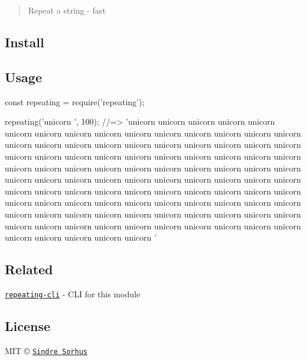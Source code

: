 \begin{quote}
Repeat a string -\/ fast \end{quote}


\subsection*{Install}




\subsection*{Usage}


\begin{DoxyCode}
const repeating = require('repeating');

repeating('unicorn ', 100);
//=> 'unicorn unicorn unicorn unicorn unicorn unicorn unicorn unicorn unicorn unicorn unicorn unicorn
       unicorn unicorn unicorn unicorn unicorn unicorn unicorn unicorn unicorn unicorn unicorn unicorn unicorn unicorn
       unicorn unicorn unicorn unicorn unicorn unicorn unicorn unicorn unicorn unicorn unicorn unicorn unicorn
       unicorn unicorn unicorn unicorn unicorn unicorn unicorn unicorn unicorn unicorn unicorn unicorn unicorn unicorn
       unicorn unicorn unicorn unicorn unicorn unicorn unicorn unicorn unicorn unicorn unicorn unicorn unicorn
       unicorn unicorn unicorn unicorn unicorn unicorn unicorn unicorn unicorn unicorn unicorn unicorn unicorn unicorn
       unicorn unicorn unicorn unicorn unicorn unicorn unicorn unicorn unicorn unicorn unicorn unicorn unicorn
       unicorn unicorn unicorn unicorn unicorn unicorn unicorn '
\end{DoxyCode}


\subsection*{Related}


\begin{DoxyItemize}
\item \href{https://github.com/sindresorhus/repeating-cli}{\tt repeating-\/cli} -\/ C\+LI for this module
\end{DoxyItemize}

\subsection*{License}

M\+IT © \href{https://sindresorhus.com}{\tt Sindre Sorhus} 